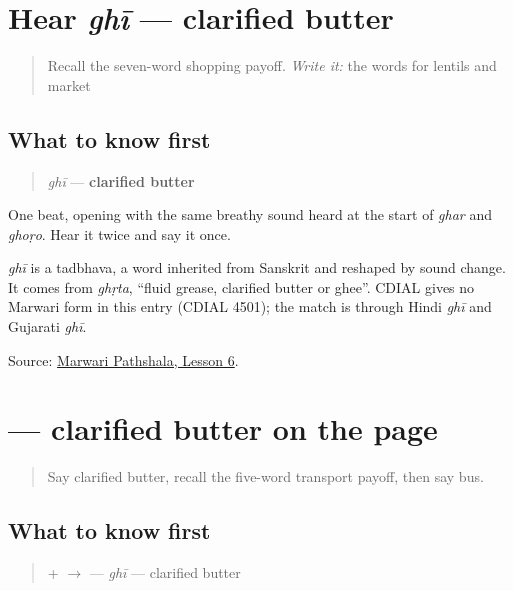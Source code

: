\section[ghī]{Hear \emph{ghī} — clarified butter}

\label{lesson:MW-C18-hear-ghee}



\begin{quote}
Recall the seven-word shopping payoff. \emph{Write it:} the words for lentils and market
\end{quote}

\subsection*{What to know first}
\begin{quote}
\emph{ghī} — \textbf{clarified butter}
\end{quote}

One beat, opening with the same breathy sound heard at the start of \emph{ghar} and \emph{ghoṛo}. Hear it twice and say it once.

\begin{cousinweb}
\emph{ghī} is a tadbhava, a word inherited from Sanskrit and reshaped by sound change. It comes from \emph{ghṛta}, \textquotedblleft{}fluid grease, clarified butter or ghee\textquotedblright{}. CDIAL gives no Marwari form in this entry (CDIAL 4501); the match is through Hindi \emph{ghī} and Gujarati \emph{ghī}.
\end{cousinweb}

\begin{tcolorbox}[breakable,colback=teal!4,colframe=teal!35!black,title={Before you move on}]
Source: \href{https://www.marwaripathshala.com/marwari-lesson-6-english}{Marwari Pathshala, Lesson 6}.
\end{tcolorbox}
\section[\texorpdfstring{\mw{घी} (ghī)}{घी (ghī)}]{ — clarified butter on the page}

\label{lesson:MW-C18-ghee}



\begin{quote}
Say clarified butter, recall the five-word transport payoff, then say bus.
\end{quote}

\subsection*{What to know first}
\begin{quote}
\textbf{} + \textbf{} $\to$ \textbf{} — \emph{ghī} — clarified butter
\end{quote}

